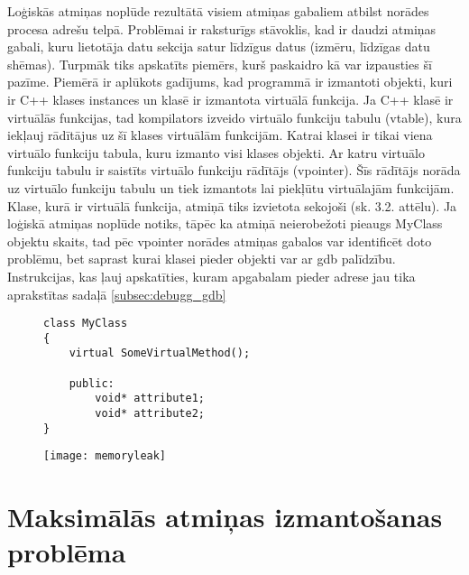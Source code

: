 Loģiskās atmiņas noplūde rezultātā visiem atmiņas gabaliem atbilst norādes procesa adrešu telpā. 
Problēmai ir raksturīgs stāvoklis, kad ir daudzi atmiņas gabali, kuru lietotāja datu sekcija satur līdzīgus datus (izmēru, līdzīgas datu shēmas).
Turpmāk tiks apskatīts piemērs, kurš paskaidro kā var izpausties šī pazīme.
Piemērā ir aplūkots gadījums, kad programmā ir izmantoti objekti, kuri ir  C++ klases instances un klasē ir izmantota virtuālā funkcija.
Ja C++ klasē ir virtuālās funkcijas, tad kompilators izveido virtuālo funkciju tabulu (vtable), kura iekļauj rādītājus uz šī klases virtuālām funkcijām.
 Katrai klasei ir tikai viena virtuālo funkciju tabula, kuru izmanto visi klases objekti.
 Ar katru virtuālo funkciju tabulu ir saistīts virtuālo funkciju rādītājs (vpointer).
 Šīs rādītājs norāda uz virtuālo funkciju tabulu un tiek izmantots lai piekļūtu virtuālajām funkcijām.
Klase, kurā ir virtuālā funkcija, atmiņā tiks izvietota sekojoši (sk. 3.2. attēlu).
Ja loģiskā atmiņas noplūde notiks, tāpēc ka atmiņā neierobežoti pieaugs MyClass objektu skaits, tad pēc vpointer norādes atmiņas gabalos var identificēt doto problēmu, bet saprast kurai klasei pieder objekti var ar gdb palīdzību.
Instrukcijas, kas ļauj apskatīties, kuram apgabalam pieder adrese jau tika aprakstītas sadaļā \ref{subsec:debugg_gdb}
\begin{figure}[h]
\begin{lstlisting}
class MyClass
{
    virtual SomeVirtualMethod();
    
    public:
        void* attribute1;
        void* attribute2;
}
\end{lstlisting}
\end{figure}
\begin{figure}[h]
\begin{center}
\texttt{[image: memoryleak]}
\end{center}
\caption{\textbf{\fontsize{11}{12}\selectfont {C++ klases ar virtuālo funkciju izvietojums atmiņā }}}
\label{fig:memoryleak}
\end{figure}



\section{Maksimālās atmiņas izmantošanas problēma}



